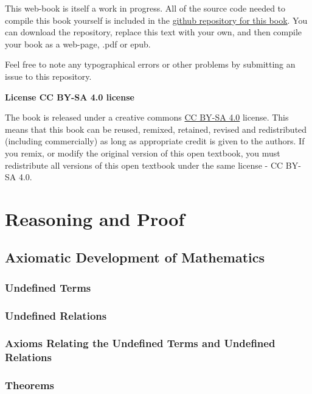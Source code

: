 \documentclass[]{book}
\begin{document}
This web-book is itself a work in progress. All of the source code
needed to compile this book yourself is included in the
\href{https://github.com/PHSMath/OERGeometry}{github repository for this
book}. You can download the repository, replace this text with your own,
and then compile your book as a web-page, .pdf or epub.

Feel free to note any typographical errors or other problems by
submitting an issue to this repository.

\textbf{License CC BY-SA 4.0 license}

The book is released under a creative commons
\href{https://creativecommons.org/licenses/by-sa/4.0/}{CC BY-SA 4.0}
license. This means that this book can be reused, remixed, retained,
revised and redistributed (including commercially) as long as
appropriate credit is given to the authors. If you remix, or modify the
original version of this open textbook, you must redistribute all
versions of this open textbook under the same license - CC BY-SA 4.0.

\chapter{Reasoning and Proof}\label{reasoning-and-proof}

\section{Axiomatic Development of
Mathematics}\label{axiomatic-development-of-mathematics}

\subsection{Undefined Terms}\label{undefined-terms}

\subsection{Undefined Relations}\label{undefined-relations}

\subsection{Axioms Relating the Undefined Terms and Undefined
Relations}\label{axioms-relating-the-undefined-terms-and-undefined-relations}

\subsection{Theorems}\label{theorems}
\end{document}
